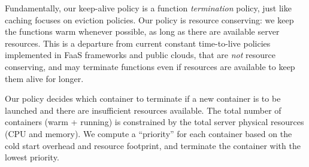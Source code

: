 Fundamentally, our keep-alive policy is a function \emph{termination} policy, just like caching focuses on eviction policies.  
Our policy is resource conserving: we keep the functions warm whenever possible, as long as there are available server resources. 
This is a departure from current constant time-to-live policies implemented in FaaS frameworks and public clouds, that are \emph{not} resource conserving, and may terminate functions even if resources are available to keep them alive for longer. 

Our policy decides which container to terminate if a new container is to be launched and there are insufficient resources available. 
The total number of containers (warm + running) is constrained by the total server physical resources (CPU and memory). 
We compute a ``priority'' for each container based on the cold start overhead and resource footprint, and terminate the container with the lowest priority.
%


%
%
%
%

%






